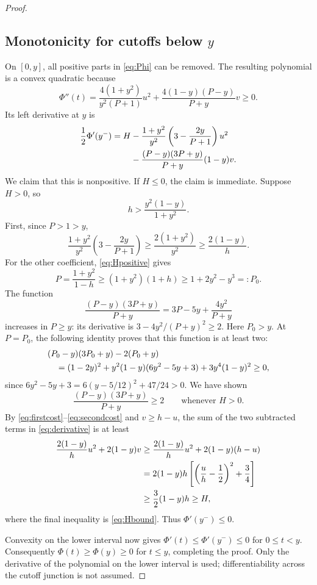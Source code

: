 \documentclass[11pt]{article}
\numberwithin{equation}{section}
\theoremstyle{remark}
\begin{document}
\begin{proof}
\subsection*{Monotonicity for cutoffs below $y$}
On $[0,y]$, all positive parts in \eqref{eq:Phi} can be removed. The resulting polynomial is a convex quadratic because
\begin{equation}\label{eq:convex}
 \Phi''(t)=\frac{4(1+y^2)}{y^2(P+1)}u^2
 +\frac{4(1-y)(P-y)}{P+y}v\ge0.
\end{equation}
Its left derivative at $y$ is
\begin{align}\label{eq:derivative}
 \frac12\Phi'(y^-)=H
 &-\frac{1+y^2}{y^2}\left(3-\frac{2y}{P+1}\right)u^2\notag\\
 &-\frac{(P-y)(3P+y)}{P+y}(1-y)v.
\end{align}
We claim that this is nonpositive. If $H\le0$, the claim is immediate. Suppose $H>0$, so
\begin{equation}\label{eq:Hpositive}
 h>\frac{y^2(1-y)}{1+y^2}.
\end{equation}
First, since $P>1>y$,
\begin{equation}\label{eq:firstcost}
 \frac{1+y^2}{y^2}\left(3-\frac{2y}{P+1}\right)
 \ge\frac{2(1+y^2)}{y^2}\ge\frac{2(1-y)}h.
\end{equation}
For the other coefficient, \eqref{eq:Hpositive} gives
\[
 P=\frac{1+y^2}{1-h}\ge(1+y^2)(1+h)
 \ge1+2y^2-y^3=:P_0.
\]
The function
\[
 \frac{(P-y)(3P+y)}{P+y}=3P-5y+\frac{4y^2}{P+y}
\]
increases in $P\ge y$: its derivative is $3-4y^2/(P+y)^2\ge2$. Here $P_0>y$. At $P=P_0$, the following identity proves that this function is at least two:
\begin{align}\label{eq:derivcert}
 &(P_0-y)(3P_0+y)-2(P_0+y)\notag\\
 &\quad=(1-2y)^2+y^2(1-y)(6y^2-5y+3)
 +3y^4(1-y)^2\ge0,
\end{align}
since $6y^2-5y+3=6(y-5/12)^2+47/24>0$. We have shown
\begin{equation}\label{eq:secondcost}
 \frac{(P-y)(3P+y)}{P+y}\ge2\qquad\text{whenever }H>0.
\end{equation}
By \eqref{eq:firstcost}--\eqref{eq:secondcost} and $v\ge h-u$, the sum of the two subtracted terms in \eqref{eq:derivative} is at least
\begin{align}\label{eq:finalsquare}
 \frac{2(1-y)}h u^2+2(1-y)v
 &\ge\frac{2(1-y)}h u^2+2(1-y)(h-u)\notag\\
 &=2(1-y)h\left[\left(\frac uh-\frac12\right)^2+\frac34\right]\notag\\
 &\ge\frac32(1-y)h\ge H,
\end{align}
where the final inequality is \eqref{eq:Hbound}. Thus $\Phi'(y^-)\le0$.

Convexity on the lower interval now gives $\Phi'(t)\le\Phi'(y^-)\le0$ for $0\le t<y$. Consequently $\Phi(t)\ge\Phi(y)\ge0$ for $t\le y$, completing the proof. Only the derivative of the polynomial on the lower interval is used; differentiability across the cutoff junction is not assumed.
\end{proof}
\end{document}
